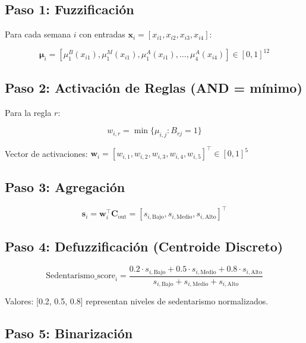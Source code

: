 \documentclass[12pt,letterpaper,twoside]{report}
\newcommand{\vect}[1]{\boldsymbol{#1}}
\newcommand{\mat}[1]{\mathbf{#1}}
\begin{document}
\subsection{Paso 1: Fuzzificación}

Para cada semana $i$ con entradas $\vect{x}_i = [x_{i1}, x_{i2}, x_{i3}, x_{i4}]$:

\begin{equation}
\vect{\mu}_i = [\mu_1^B(x_{i1}), \mu_1^M(x_{i1}), \mu_1^A(x_{i1}), \ldots, \mu_4^A(x_{i4})] \in [0,1]^{12}
\end{equation}

\subsection{Paso 2: Activación de Reglas (AND = mínimo)}

Para la regla $r$:

\begin{equation}
w_{i,r} = \min\{\mu_{i,j} : B_{rj} = 1\}
\end{equation}

Vector de activaciones: $\vect{w}_i = [w_{i,1}, w_{i,2}, w_{i,3}, w_{i,4}, w_{i,5}]^\top \in [0,1]^5$

\subsection{Paso 3: Agregación}

\begin{equation}
\vect{s}_i = \vect{w}_i^\top \mat{C}_{\text{out}} = [s_{i,\text{Bajo}}, s_{i,\text{Medio}}, s_{i,\text{Alto}}]^\top
\end{equation}

\subsection{Paso 4: Defuzzificación (Centroide Discreto)}

\begin{equation}
\text{Sedentarismo\_score}_i = \frac{0.2 \cdot s_{i,\text{Bajo}} + 0.5 \cdot s_{i,\text{Medio}} + 0.8 \cdot s_{i,\text{Alto}}}{s_{i,\text{Bajo}} + s_{i,\text{Medio}} + s_{i,\text{Alto}}}
\end{equation}

Valores: [0.2, 0.5, 0.8] representan niveles de sedentarismo normalizados.

\subsection{Paso 5: Binarización}
\end{document}
